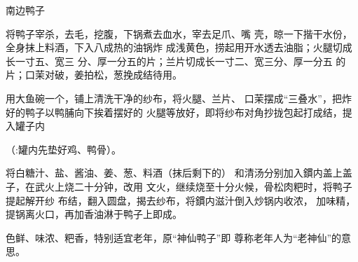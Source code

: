 \begin{recipe}[神仙鸭子]{南边鸭子}

\ingredients




\cooking

\step 将鸭子宰杀，去毛，挖腹，下锅煮去血水，宰去足爪、嘴 壳，晾一下揩干水份，全身抹上料酒，下入八成热的油锅炸 成浅黄色，捞起用开水透去油脂；火腿切成长一寸五、宽三 分、厚一分五的片；兰片切成长一寸二、宽三分、厚一分五 的片；口茉对破，姜拍松，葱挽成结待用。

\step 用大鱼碗一个，铺上清洗干净的纱布，将火腿、兰片、 口茉摆成“三叠水”，把炸好的鸭子以鸭脯向下挨着摆好的 火腿等放好，即将纱布对角抄拢包起打成结，提入罐子内

（:罐内先垫好鸡、鸭骨）。

\step 将白糖汁、盐、酱油、姜、葱、料酒（抹后剩下的） 和清汤分别加入鏆内盖上盖子，在武火上烧二十分钟，改用 文火，继续烧至十分火候，骨松肉粑时，将鸭子提起解开纱 布结，翻入圆盘，揭去纱布，将鏆内滋汁倒入炒锅内收浓， 加味精，提锅离火口，再加香油淋于鸭子上即成。

\notes

色鲜、味浓、粑香，特别适宜老年，原“神仙鸭子”即 尊称老年人为“老神仙”的意思。

\end{recipe}

